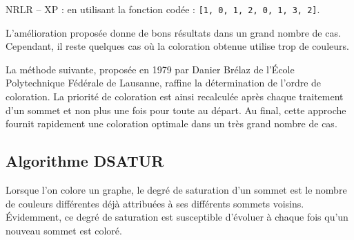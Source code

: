 \ifprof
\begin{corrige}
NRLR -- XP : en utilisant la fonction codée : \lstinline{[1, 0, 1, 2, 0, 1, 3, 2]}.
\end{corrige}
\else
\fi

L'amélioration proposée donne de bons résultats dans un grand nombre de cas. Cependant, il reste quelques cas où la coloration obtenue utilise trop de couleurs.

La méthode suivante, proposée en 1979 par Danier Brélaz de l'École Polytechnique Fédérale de Lausanne, raffine la détermination de l'ordre de coloration. La priorité de coloration est ainsi recalculée après chaque traitement d'un sommet et non plus une fois pour toute au départ. Au final, cette approche fournit rapidement une coloration optimale dans un très grand nombre de cas.


\subsection{Algorithme DSATUR}
Lorsque l’on colore un graphe, le degré de saturation d’un sommet est le nombre de couleurs différentes déjà attribuées à ses différents sommets voisins. Évidemment, ce degré de saturation est susceptible d’évoluer à chaque fois qu’un nouveau sommet est coloré.

\ifprof
\ifprof
\begin{corrige}~\\ \vspace{-.5cm}

\end{corrige}
\else
\fi
\else
\fi


\ifprof
\begin{corrige}

\end{corrige}
\else
\fi


